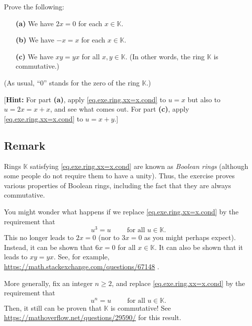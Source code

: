 \documentclass[paper=a4, fontsize=12pt]{scrartcl}%
\theoremstyle{plainsl}
\theoremstyle{definition}
\theoremstyle{remark}
\begin{document}
Prove the following:

\begin{enumerate}
\item[\textbf{(a)}] We have $2x = 0$ for each $x \in\mathbb{K}$.

\item[\textbf{(b)}] We have $-x = x$ for each $x \in\mathbb{K}$.

\item[\textbf{(c)}] We have $xy = yx$ for all $x, y \in\mathbb{K}$. (In other
words, the ring $\mathbb{K}$ is commutative.)
\end{enumerate}

(As usual, ``$0$'' stands for the zero of the ring $\mathbb{K}$.)

[\textbf{Hint:} For part \textbf{(a)}, apply \eqref{eq.exe.ring.xx=x.cond} to
$u=x$ but also to $u=2x=x+x$, and see what comes out. For part \textbf{(c)},
apply \eqref{eq.exe.ring.xx=x.cond} to $u=x+y$.]

\subsection{Remark}

Rings $\mathbb{K}$ satisfying \eqref{eq.exe.ring.xx=x.cond} are known as
\textit{Boolean rings} (although some people do not require them to have a
unity). Thus, the exercise proves various properties of Boolean rings,
including the fact that they are always commutative.

You might wonder what happens if we replace \eqref{eq.exe.ring.xx=x.cond} by
the requirement that
\begin{equation}
u^{3}=u\qquad\text{ for all }u\in\mathbb{K}. \label{eq.exe.ring.xx=x.cond3}%
\end{equation}
This no longer leads to $2x=0$ (nor to $3x=0$ as you might perhaps expect).
Instead, it can be shown that $6x=0$ for all $x\in\mathbb{K}$. It can also be
shown that it leads to $xy=yx$. See, for example,
\url{https://math.stackexchange.com/questions/67148} .

More generally, fix an integer $n\geq2$, and replace
\eqref{eq.exe.ring.xx=x.cond} by the requirement that
\begin{equation}
u^{n}=u\qquad\text{ for all }u\in\mathbb{K}. \label{eq.exe.ring.xx=x.condn}%
\end{equation}
Then, it still can be proven that $\mathbb{K}$ is commutative! See
\url{https://mathoverflow.net/questions/29590/} for this result.
\end{document}
